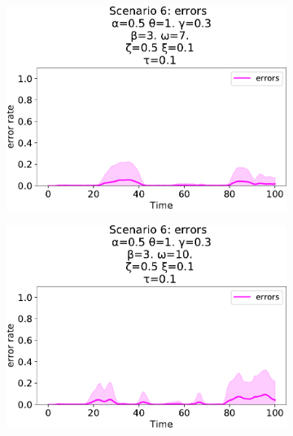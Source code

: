 \begin{figure}[!ht]
\begin{subfigure}[b]{0.32\textwidth}
    \includegraphics[width=\textwidth]{papers/swarm-intelligence2021/img/simulations/movement-errors_0_08_α-0.5_θ-1._γ-0.3_β-3._ω-7._ζ-0.5.pdf}
  \end{subfigure}
  \hfill
  \begin{subfigure}[b]{0.32\textwidth}
    \centering
    \includegraphics[width=\textwidth]{papers/swarm-intelligence2021/img/simulations/movement-errors_0_08_α-0.5_θ-1._γ-0.3_β-3._ω-10._ζ-0.5.pdf}
  \end{subfigure}
  \hfill
  \begin{subfigure}[b]{0.32\textwidth}
    \centering

\end{subfigure}
\end{figure}
